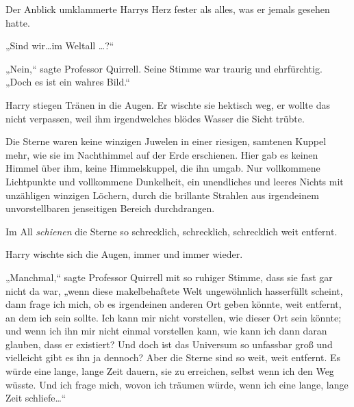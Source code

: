 Der Anblick umklammerte Harrys Herz fester als alles, was er jemals gesehen hatte.

„Sind wir…im Weltall …?“

„Nein,“ sagte Professor Quirrell. Seine Stimme war traurig und ehrfürchtig. „Doch es ist ein wahres Bild.“

Harry stiegen Tränen in die Augen. Er wischte sie hektisch weg, er wollte das nicht verpassen, weil ihm irgendwelches blödes Wasser die Sicht trübte.

Die Sterne waren keine winzigen Juwelen in einer riesigen, samtenen Kuppel mehr, wie sie im Nachthimmel auf der Erde erschienen. Hier gab es keinen Himmel über ihm, keine Himmelskuppel, die ihn umgab. Nur vollkommene Lichtpunkte und vollkommene Dunkelheit, ein unendliches und leeres Nichts mit unzähligen winzigen Löchern, durch die brillante Strahlen aus irgendeinem unvorstellbaren jenseitigen Bereich durchdrangen.

Im All \emph{schienen} die Sterne so schrecklich, schrecklich, schrecklich weit entfernt.

Harry wischte sich die Augen, immer und immer wieder.

„Manchmal,“ sagte Professor Quirrell mit so ruhiger Stimme, dass sie fast gar nicht da war, „wenn diese makelbehaftete Welt ungewöhnlich hasserfüllt scheint, dann frage ich mich, ob es irgendeinen anderen Ort geben könnte, weit entfernt, an dem ich sein sollte. Ich kann mir nicht vorstellen, wie dieser Ort sein könnte; und wenn ich ihn mir nicht einmal vorstellen kann, wie kann ich dann daran glauben, dass er existiert? Und doch ist das Universum so unfassbar groß und vielleicht gibt es ihn ja dennoch? Aber die Sterne sind so weit, weit entfernt. Es würde eine lange, lange Zeit dauern, sie zu erreichen, selbst wenn ich den Weg wüsste. Und ich frage mich, wovon ich träumen würde, wenn ich eine lange, lange Zeit schliefe…“

